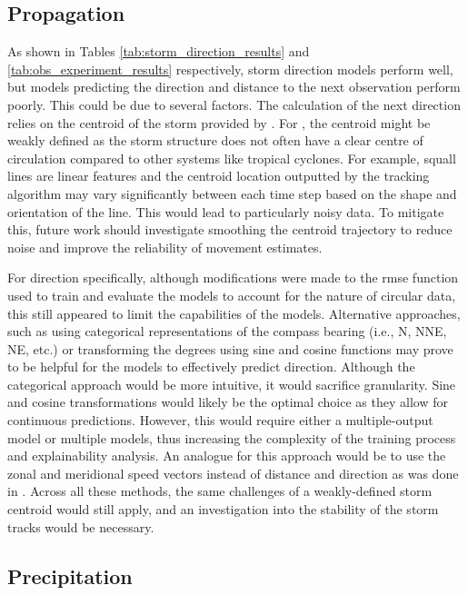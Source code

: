 \subsection{Propagation}
\label{sec:results-propagation}

As shown in Tables \ref{tab:storm_direction_results} and \ref{tab:obs_experiment_results} respectively, storm direction models perform well, but models predicting the direction and distance to the next observation perform poorly. This could be due to several factors. The calculation of the next direction relies on the centroid of the storm provided by \cite{Hill2023}. For , the centroid might be weakly defined as the storm structure does not often have a clear centre of circulation compared to other systems like tropical cyclones. For example, squall lines are linear features and the centroid location outputted by the tracking algorithm may vary significantly between each time step based on the shape and orientation of the line. This would lead to particularly noisy data. To mitigate this, future work should investigate smoothing the centroid trajectory to reduce noise and improve the reliability of movement estimates.

For direction specifically, although modifications were made to the \acrshort{rmse} function used to train and evaluate the models to account for the nature of circular data, this still appeared to limit the capabilities of the models. Alternative approaches, such as using categorical representations of the compass bearing (i.e., N, NNE, NE, etc.) or transforming the degrees using sine and cosine functions may prove to be helpful for the models to effectively predict direction. Although the categorical approach would be more intuitive, it would sacrifice granularity. Sine and cosine transformations would likely be the optimal choice as they allow for continuous predictions. However, this would require either a multiple-output model or multiple models, thus increasing the complexity of the training process and explainability analysis. An analogue for this approach would be to use the zonal and meridional speed vectors instead of distance and direction as was done in \cite{Hunt2024}. Across all these methods, the same challenges of a weakly-defined storm centroid would still apply, and an investigation into the stability of the storm tracks would be necessary.

\clearpage
\subsection{Precipitation}

